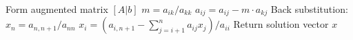 \begin{algorithm}[H]
\caption{Gauss Elimination Method}
\begin{algorithmic}[1]
\STATE Form augmented matrix $[A|b]$
        \STATE $m = a_{ik}/a_{kk}$
            \STATE $a_{ij} = a_{ij} - m \cdot a_{kj}$
        \ENDFOR
    \ENDFOR
\ENDFOR
\STATE Back substitution:
\STATE $x_n = a_{n,n+1}/a_{nn}$
    \STATE $x_i = (a_{i,n+1} - \sum_{j=i+1}^n a_{ij}x_j)/a_{ii}$
\ENDFOR
\STATE Return solution vector $x$
\end{algorithmic}
\end{algorithm}
